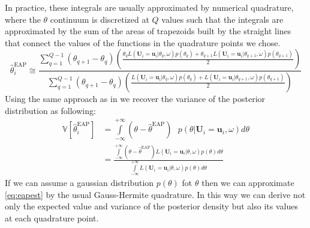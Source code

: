 In practice, these integrals are usually approximated by numerical quadrature,
where the $\theta$ continuum is discretized at $Q$ values such that the integrals are approximated by the sum of the areas of trapezoids built by the straight lines that connect the values of the functions in the quadrature points we chose.
\begin{equation}
\hat{\theta}^{\text{EAP}}_i \cong \frac{ \sum_{q=1}^{Q-1} \left(\theta_{q+1}-\theta_q \right) \left(\frac{\theta_q L\left(\mathbf{U}_i=\mathbf{u}_i|\theta_q,\omega\right)p\left(\theta_q\right) + \theta_{q+1} L\left(\mathbf{U}_i=\mathbf{u}_i|\theta_{q+1},\omega\right)p\left(\theta_{q+1} \right)}{2}\right)}{\sum_{q=1}^{Q-1}\left(\theta_{q+1}-\theta_q \right) \left(\frac{L\left(\mathbf{U}_i=\mathbf{u}_i|\theta_q,\omega\right)p\left(\theta_q\right) + L\left(\mathbf{U}_i=\mathbf{u}_i|\theta_{q+1},\omega\right)p\left(\theta_{q+1} \right)}{2}\right)}
\end{equation}
Using the same approach as in \cite{BockMislevy1982} we recover the variance of the posterior distribution as following:
\begin{subequations}\label{eq:eapvar}
\begin{align}
\mathbb{V}[\hat{\theta}^{\text{EAP}}_i]&=\int\limits_{-\infty}^{+\infty}\left(\theta-\hat{\theta}^{\text{EAP}}\right)\text{ }p\left(\theta |\mathbf{U}_i=\mathbf{u}_i,\omega \right)d\theta \\
&=\frac{\int\limits_{-\infty}^{+\infty}\left(\theta-\hat{\theta}^{\text{EAP}}\right) L\left(\mathbf{U}_i=\mathbf{u}_i|\theta,\omega\right)p\left(\theta\right)d\theta}{\int\limits_{-\infty}^{+\infty}L\left(\mathbf{U}_i=\mathbf{u}_i|\theta,\omega\right)p\left(\theta\right)d\theta}
\end{align}
\end{subequations}
If we can assume a gaussian distribution $p(\theta)$ fot $\theta$ then we can approximate \eqref{eq:eapest} by the usual Gauss-Hermite quadrature. In this way we can derive not only the expected value and variance of the posterior density but also its values at each quadrature point.
